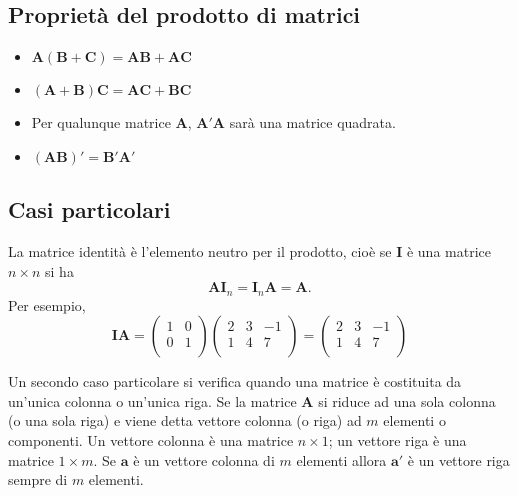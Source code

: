 \subsection{Proprietà del prodotto di matrici}

\begin{itemize}
    \item $\boldsymbol{A}(\boldsymbol{B} + \boldsymbol{C}) = \boldsymbol{AB} +
    \boldsymbol{AC}$
    \item $(\boldsymbol{A} + \boldsymbol{B})\boldsymbol{C} = \boldsymbol{AC} +
    \boldsymbol{BC}$
    \item Per qualunque matrice $\boldsymbol{A}$, $\boldsymbol{A}'\boldsymbol{A}$ sar{\`a} una matrice quadrata.
    \item $(\boldsymbol{AB})' = \boldsymbol{B}'\boldsymbol{A}'$
\end{itemize}

\subsection{Casi particolari}

La matrice identit{\`a} {\`e} l'elemento neutro per il prodotto,
cio{\`e} se $\boldsymbol{I}$ {\`e} una matrice $n \times n$ si ha
\[
\boldsymbol{A} \boldsymbol{I}_n = \boldsymbol{I}_n \boldsymbol{A}
= \boldsymbol{A}.
\]
 Per esempio, 
\[
\boldsymbol{IA} = \left(%
\begin{array}{cc}
  1 & 0 \\
  0 & 1 \\
\end{array}%
\right)
\left(%
\begin{array}{ccc}
  2 & 3 & -1 \\
  1 & 4 & 7 \\
\end{array}%
\right)=
\left(%
\begin{array}{ccc}
  2 & 3 & -1 \\
  1 & 4 & 7 \\
\end{array}%
\right)
\]

Un secondo caso particolare si verifica quando una matrice {\`e}
costituita da un'unica colonna o un'unica riga.
Se la matrice $\boldsymbol{A}$  si riduce ad una sola colonna (o
una sola riga) e viene detta vettore colonna (o riga) ad $m$
elementi o componenti.
 Un  vettore colonna {\`e} una matrice $n \times 1$; un  vettore riga {\`e}
una matrice $1 \times m$.
Se $\boldsymbol{a}$ {\`e} un vettore colonna di $m$ elementi allora
$\boldsymbol{a}'$ {\`e} un vettore riga sempre di $m$ elementi.

